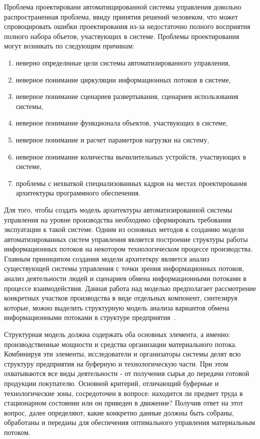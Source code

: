 Проблема проектировани автоматищированной системы управления довольно распространенная проблема, ввиду принятия решений человеком, что может спровоцировать ошибки проектирования из-за недостаточно полного восприятия полного набора объетов, участвующих в системе.
Проблемы проектирования могут возникать по следующим причинам:
\begin{enumerate}
    \item неверно определнные цели системы автоматизированного управления,
    \item неверное понимание циркуляции информационных потоков в системе,
    \item неверное понимание сценариев развертывания, сценариев использования системы,
    \item неверное понимание функционала объектов, участвующих в системе,
    \item неверное понимание и расчет параметров нагрузки на систему,
    \item неверное понимание количества вычилительных устройств, участвующих в системе,
    \item проблемы с нехваткой специализованных кадров на местах проектирования архитектуры программного обеспечения.
\end{enumerate}

Для того, чтобы создать модель архитектуры автоматизированной системы управления на уровне производства необходимо сформировать требования экспуатации к такой системе. Одним из основных методов к созданию модели автоматизированных систем управления является построение структуры работы информационных потоков на некотором технологическом процессе производства. Главным приниципом создания модели архитеткру является анализ существующей системы управления с точки зрения информационных потоков, анализ деятельности людей и сценариев обмена информационными потоками в процессе взаимодействия. Данная работа над моделью предполагает рассмотрение конкретных участков производства в виде отдельных компонент, синтезируя которые, можно выделить структурную модель анализа вариантов обмена информационными потоками в структуре предприятия~\cite{Ref13, Ref14, Ref15, Ref16,Ref17,Ref18,Ref19, Ref20, Ref21, Ref22,Ref23,Ref24}.

Структурная модель должна содержать оба основных элемента, а именно: производственные мощности и средства организации материального потока. Комбинируя эти элементы, исследователи и организаторы системы делят всю структуру предприятия на буферную и технологическую части. При этом охватываются все виды деятельности - от получения сырья до передачи готовой продукции покупателю. Основной критерий, отличающий буферные и технологические зоны, сосредоточен в вопросе: находится ли предмет труда в стационарном состоянии или он приведен в движение? Получив ответ на этот вопрос, далее определяют, какие конкретно данные должны быть собраны, обработаны и переданы для обеспечения оптимального управления материальным потоком.


